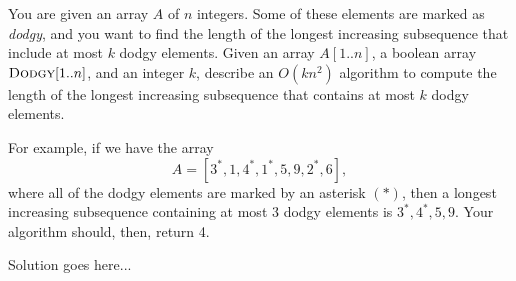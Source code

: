 \documentclass{article}
\begin{document}
\begin{question}
You are given an array $A$ of $n$ integers. Some of these elements are marked as {\em dodgy}, and you want to find the length of the longest increasing subsequence that include at most $k$ dodgy elements. Given an array $A[1..n]$, a boolean array $\mathsf{\textsc{Dodgy}}[1..n]$, and an integer $k$, describe an $O(kn^2)$ algorithm to compute the length of the longest increasing subsequence that contains at most $k$ dodgy elements.

For example, if we have the array \[A = [3^*, 1, 4^*, 1^*, 5, 9, 2^*, 6],\] where all of the dodgy elements are marked by an asterisk $(*)$, then a longest increasing subsequence containing at most 3 dodgy elements is $3^*, 4^*, 5, 9$. Your algorithm should, then, return 4.
\end{question}

\begin{solution}
Solution goes here...
\end{solution}
\end{document}
